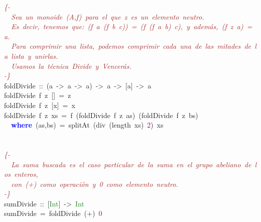 \noindent
\mbox{}\textit{\textcolor{Brown}{\{-}} \\
\mbox{}\textit{\textcolor{Brown}{\ \ Sea\ un\ monoide\ (A,f)\ para\ el\ que\ z\ es\ un\ elemento\ neutro.\ }} \\
\mbox{}\textit{\textcolor{Brown}{\ \ Es\ decir,\ tenemos\ que:\ (f\ a\ (f\ b\ c))\ =\ (f\ (f\ a\ b)\ c),\ y\ además,\ (f\ z\ a)\ =\ a.\ }} \\
\mbox{}\textit{\textcolor{Brown}{\ \ Para\ comprimir\ una\ lista,\ podemos\ comprimir\ cada\ una\ de\ las\ mitades\ de\ la\ lista\ y\ unirlas.}} \\
\mbox{}\textit{\textcolor{Brown}{\ \ Usamos\ la\ técnica\ Divide\ y\ Vencerás.}} \\
\mbox{}\textit{\textcolor{Brown}{-\}}} \\
\mbox{}foldDivide\ \textcolor{BrickRed}{::}\ \textcolor{BrickRed}{(}a\ \textcolor{BrickRed}{-\textgreater{}}\ a\ \textcolor{BrickRed}{-\textgreater{}}\ a\textcolor{BrickRed}{)}\ \textcolor{BrickRed}{-\textgreater{}}\ a\ \textcolor{BrickRed}{-\textgreater{}}\ \textcolor{BrickRed}{[}a\textcolor{BrickRed}{]}\ \textcolor{BrickRed}{-\textgreater{}}\ a \\
\mbox{}foldDivide\ f\ z\ \textcolor{BrickRed}{[]}\ \textcolor{BrickRed}{=}\ z \\
\mbox{}foldDivide\ f\ z\ \textcolor{BrickRed}{[}x\textcolor{BrickRed}{]}\ \textcolor{BrickRed}{=}\ x \\
\mbox{}foldDivide\ f\ z\ xs\ \textcolor{BrickRed}{=}\ f\ \textcolor{BrickRed}{(}foldDivide\ f\ z\ as\textcolor{BrickRed}{)}\ \textcolor{BrickRed}{(}foldDivide\ f\ z\ bs\textcolor{BrickRed}{)} \\
\mbox{}\ \ \textbf{\textcolor{Blue}{where}}\ \textcolor{BrickRed}{(}as\textcolor{BrickRed}{,}bs\textcolor{BrickRed}{)}\ \textcolor{BrickRed}{=}\ splitAt\ \textcolor{BrickRed}{(}div\ \textcolor{BrickRed}{(}length\ xs\textcolor{BrickRed}{)}\ \textcolor{Purple}{2}\textcolor{BrickRed}{)}\ xs \\
\mbox{} \\
\mbox{} \\
\mbox{}\textit{\textcolor{Brown}{\{-}} \\
\mbox{}\textit{\textcolor{Brown}{\ \ La\ suma\ buscada\ es\ el\ caso\ particular\ de\ la\ suma\ en\ el\ grupo\ abeliano\ de\ los\ enteros,}} \\
\mbox{}\textit{\textcolor{Brown}{\ \ con\ (+)\ como\ operación\ y\ 0\ como\ elemento\ neutro.}} \\
\mbox{}\textit{\textcolor{Brown}{-\}}} \\
\mbox{}sumDivide\ \textcolor{BrickRed}{::}\ \textcolor{BrickRed}{[}\textcolor{ForestGreen}{Int}\textcolor{BrickRed}{]}\ \textcolor{BrickRed}{-\textgreater{}}\ \textcolor{ForestGreen}{Int} \\
\mbox{}sumDivide\ \textcolor{BrickRed}{=}\ foldDivide\ \textcolor{BrickRed}{(+)}\ \textcolor{Purple}{0}
